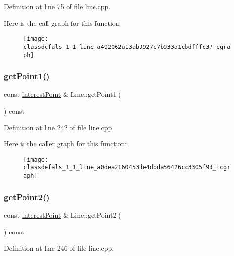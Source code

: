 Definition at line 75 of file line.\+cpp.

Here is the call graph for this function\+:\nopagebreak
\begin{figure}[H]
\begin{center}
\leavevmode
\texttt{[image: classdefals\_1\_1\_line\_a492062a13ab9927c7b933a1cbdfffc37\_cgraph]}
\end{center}
\end{figure}
\mbox{\label{classdefals_1_1_line_a0dea2160453de4dbda56426cc3305f93}} 
\subsubsection{\texorpdfstring{get\+Point1()}{getPoint1()}}
{\footnotesize\ttfamily const \hyperlink{classdefals_1_1_interest_point}{Interest\+Point} \& Line\+::get\+Point1 (\begin{DoxyParamCaption}{ }\end{DoxyParamCaption}) const}



Definition at line 242 of file line.\+cpp.

Here is the caller graph for this function\+:\nopagebreak
\begin{figure}[H]
\begin{center}
\leavevmode
\texttt{[image: classdefals\_1\_1\_line\_a0dea2160453de4dbda56426cc3305f93\_icgraph]}
\end{center}
\end{figure}
\mbox{\label{classdefals_1_1_line_a21ad33e8b62513d0b9ca68a345f61f5a}} 
\subsubsection{\texorpdfstring{get\+Point2()}{getPoint2()}}
{\footnotesize\ttfamily const \hyperlink{classdefals_1_1_interest_point}{Interest\+Point} \& Line\+::get\+Point2 (\begin{DoxyParamCaption}{ }\end{DoxyParamCaption}) const}



Definition at line 246 of file line.\+cpp.

